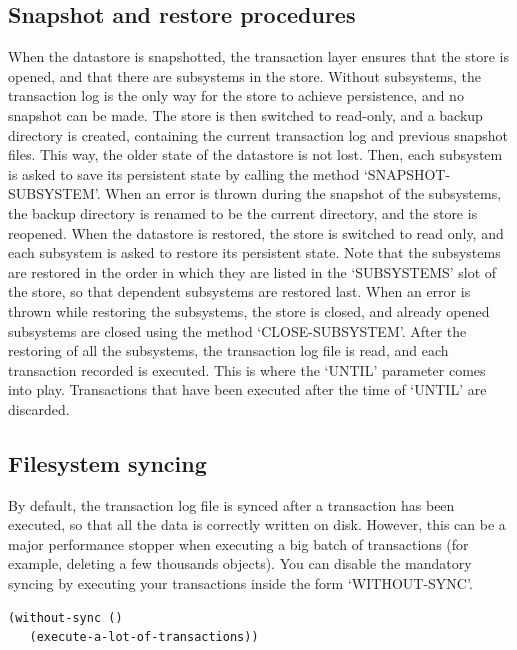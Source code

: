 \subsection{ Snapshot and restore procedures}
When the datastore is snapshotted, the transaction layer ensures
that the store is opened, and that there are subsystems in the
store. Without subsystems, the transaction log is the only way for
the store to achieve persistence, and no snapshot can be made. The
store is then switched to read-only, and a backup directory is
created, containing the current transaction log and previous
snapshot files. This way, the older state of the datastore is not
lost. Then, each subsystem is asked to save its persistent state
by calling the method `SNAPSHOT-SUBSYSTEM'. When an error is
thrown during the snapshot of the subsystems, the backup directory
is renamed to be the current directory, and the store is
reopened.
When the datastore is restored, the store is switched to read
only, and each subsystem is asked to restore its persistent
state. Note that the subsystems are restored in the order in which
they are listed in the `SUBSYSTEMS' slot of the store, so that
dependent subsystems are restored last. When an error is thrown
while restoring the subsystems, the store is closed, and already
opened subsystems are closed using the method
`CLOSE-SUBSYSTEM'. After the restoring of all the subsystems, the
transaction log file is read, and each transaction recorded is
executed. This is where the `UNTIL' parameter comes into
play. Transactions that have been executed after the time of
`UNTIL' are discarded.


\subsection{ Filesystem syncing}
By default, the transaction log file is synced after a transaction
has been executed, so that all the data is correctly written on
disk. However, this can be a major performance stopper when
executing a big batch of transactions (for example, deleting a few
thousands objects). You can disable the mandatory syncing by
executing your transactions inside the form `WITHOUT-SYNC'.

\begin{Verbatim}[fontsize=\small,frame=leftline,framerule=0.9mm,rulecolor=\color{gray},framesep=5.1mm,xleftmargin=5mm,fontfamily=cmtt]
(without-sync ()
   (execute-a-lot-of-transactions))
\end{Verbatim}


